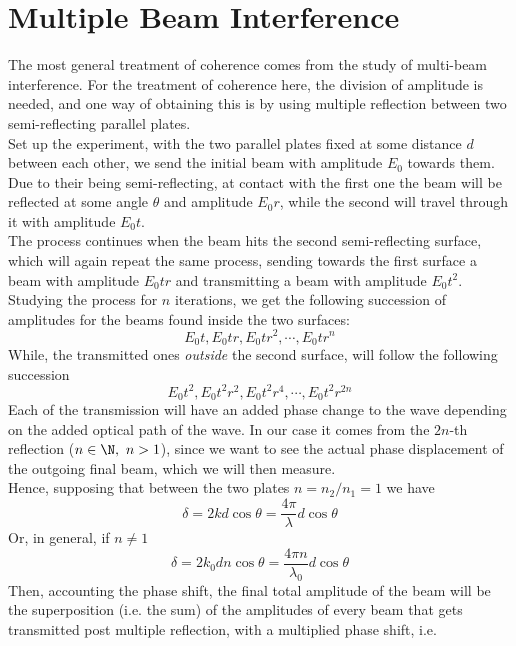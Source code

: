 \documentclass[../electromagnetism.tex]{subfiles}
\begin{document}
\section{Multiple Beam Interference}
The most general treatment of coherence comes from the study of multi-beam interference. For the treatment of coherence here, the division of amplitude is needed, and one way of obtaining this is by using multiple reflection between two semi-reflecting parallel plates.\\
Set up the experiment, with the two parallel plates fixed at some distance $d$ between each other, we send the initial beam with amplitude $E_0$ towards them. Due to their being semi-reflecting, at contact with the first one the beam will be reflected at some angle $\theta$ and amplitude $E_0r$, while the second will travel through it with amplitude $E_0t$.\\
The process continues when the beam hits the second semi-reflecting surface, which will again repeat the same process, sending towards the first surface a beam with amplitude $E_0tr$ and transmitting a beam with amplitude $E_0t^2$.\\
Studying the process for $n$ iterations, we get the following succession of amplitudes for the beams found inside the two surfaces:
\begin{equation*}
	E_0t,E_0tr,E_0tr^2,\cdots,E_0tr^n
\end{equation*}
While, the transmitted ones \textit{outside} the second surface, will follow the following succession
\begin{equation*}
	E_0t^2,E_0t^2r^2,E_0t^2r^4,\cdots,E_0t^2r^{2n}
\end{equation*}
Each of the transmission will have an added phase change to the wave depending on the added optical path of the wave. In our case it comes from the $2n$-th reflection ($n\in\N,\ n>1$), since we want to see the actual phase displacement of the outgoing final beam, which we will then measure.\\
Hence, supposing that between the two plates $n=n_2/n_1=1$ we have
\begin{equation}
	\delta=2kd\cos\theta=\frac{4\pi}{\lambda}d\cos\theta
	\label{eq:phasediff}
\end{equation}
Or, in general, if $n\ne1$
\begin{equation}
	\delta=2k_0dn\cos\theta=\frac{4\pi n}{\lambda_0}d\cos\theta
	\label{eq:phasediffnnot1}
\end{equation}
Then, accounting the phase shift, the final total amplitude of the beam will be the superposition (i.e. the sum) of the amplitudes of every beam that gets transmitted post multiple reflection, with a multiplied phase shift, i.e.
\end{document}
